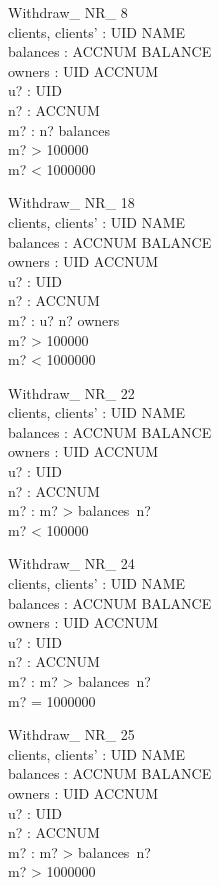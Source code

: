 \begin{schema}{Withdraw\_ NR\_ 8}\\
 clients, clients' : UID \pfun NAME \\
 balances : ACCNUM \pfun BALANCE \\
 owners : UID \rel ACCNUM \\
 u? : UID \\
 n? : ACCNUM \\
 m? : \nat 
\where
 n? \notin \dom balances \\
 m? > 100000 \\
 m? < 1000000
\end{schema}

\begin{schema}{Withdraw\_ NR\_ 18}\\
 clients, clients' : UID \pfun NAME \\
 balances : ACCNUM \pfun BALANCE \\
 owners : UID \rel ACCNUM \\
 u? : UID \\
 n? : ACCNUM \\
 m? : \nat 
\where
 u? \mapsto n? \notin owners \\
 m? > 100000 \\
 m? < 1000000
\end{schema}

\begin{schema}{Withdraw\_ NR\_ 22}\\
 clients, clients' : UID \pfun NAME \\
 balances : ACCNUM \pfun BALANCE \\
 owners : UID \rel ACCNUM \\
 u? : UID \\
 n? : ACCNUM \\
 m? : \nat 
\where
 m? > balances~n? \\
 m? < 100000
\end{schema}

\begin{schema}{Withdraw\_ NR\_ 24}\\
 clients, clients' : UID \pfun NAME \\
 balances : ACCNUM \pfun BALANCE \\
 owners : UID \rel ACCNUM \\
 u? : UID \\
 n? : ACCNUM \\
 m? : \nat 
\where
 m? > balances~n? \\
 m? = 1000000
\end{schema}


\begin{schema}{Withdraw\_ NR\_ 25}\\
 clients, clients' : UID \pfun NAME \\
 balances : ACCNUM \pfun BALANCE \\
 owners : UID \rel ACCNUM \\
 u? : UID \\
 n? : ACCNUM \\
 m? : \nat 
\where
 m? > balances~n? \\
 m? > 1000000
\end{schema}



